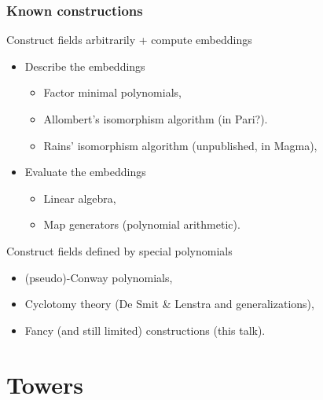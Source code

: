 \documentclass[12pt]{beamer}
\begin{document}

\begin{frame}
  \frametitle{Known constructions}

  \begin{block}{Construct fields arbitrarily + compute embeddings}
    \begin{itemize}
    \item Describe the embeddings
      \begin{itemize}
      \item Factor minimal polynomials,
      \item Allombert's isomorphism algorithm (in Pari?).
      \item Rains' isomorphism algorithm (unpublished, in Magma),
      \end{itemize}
    \item Evaluate the embeddings
      \begin{itemize}
      \item Linear algebra,
      \item Map generators (polynomial arithmetic).
      \end{itemize}
    \end{itemize}
  \end{block}
  
  \begin{block}{Construct fields defined by special polynomials}
    \begin{itemize}
    \item (pseudo)-Conway polynomials,
    \item Cyclotomy theory (De Smit \& Lenstra and generalizations),
    \item Fancy (and still limited) constructions (this talk).
    \end{itemize}
  \end{block}
\end{frame}


\section{Towers}
\frame{\sectionpage}

\end{document}
